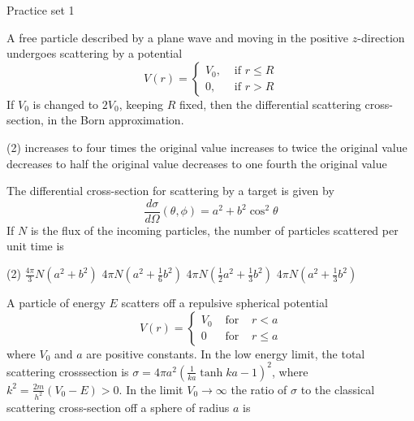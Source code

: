  \newpage
 \begin{abox}
 	Practice set 1
 	\end{abox}
 \begin{enumerate}
 	\begin{minipage}{\textwidth}
 	\item A free particle described by a plane wave and moving in the positive $z$-direction undergoes scattering by a potential
 	$$
 	V(r)= \begin{cases}V_{0}, & \text { if } r \leq R \\ 0, & \text { if } r>R\end{cases}
 	$$
 	If $V_{0}$ is changed to $2 V_{0}$, keeping $R$ fixed, then the differential scattering cross-section, in the Born approximation.
 \end{minipage}
 \begin{tasks}(2)
 	\task[\textbf{A.}]increases to four times the original value
 	\task[\textbf{B.}]increases to twice the original value
 	\task[\textbf{C.}]decreases to half the original value
 	\task[\textbf{D.}]decreases to one fourth the original value
 \end{tasks}
\begin{minipage}{\textwidth}
	\item The differential cross-section for scattering by a target is given by
	$$
	\frac{d \sigma}{d \Omega}(\theta, \phi)=a^{2}+b^{2} \cos ^{2} \theta
	$$
	If $N$ is the flux of the incoming particles, the number of particles scattered per unit time is
\end{minipage}
\begin{tasks}(2)
	\task[\textbf{A.}] $\frac{4 \pi}{3} N\left(a^{2}+b^{2}\right)$
	\task[\textbf{B.}]$4 \pi N\left(a^{2}+\frac{1}{6} b^{2}\right)$
	\task[\textbf{C.}]$4 \pi N\left(\frac{1}{2} a^{2}+\frac{1}{3} b^{2}\right)$
	\task[\textbf{D.}]$4 \pi N\left(a^{2}+\frac{1}{3} b^{2}\right)$
\end{tasks}
\begin{minipage}{\textwidth}
	\item A particle of energy $E$ scatters off a repulsive spherical potential
	$$
	V(r)=\left\{\begin{array}{ccc}
	V_{0} & \text { for } & r<a \\
	0 & \text { for } & r \leq a
	\end{array}\right.
	$$
	where $V_{0}$ and $a$ are positive constants. In the low energy limit, the total scattering crosssection is $\sigma=4 \pi a^{2}\left(\frac{1}{k a} \tanh k a-1\right)^{2}$, where $k^{2}=\frac{2 m}{h^{2}}\left(V_{0}-E\right)>0$. In the limit $V_{0} \rightarrow \infty$ the ratio of $\sigma$ to the classical scattering cross-section off a sphere of radius $a$ is

\end{minipage}
\end{enumerate}
